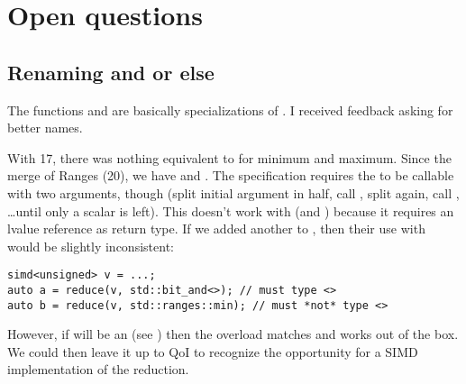 \section{Open questions}

\subsection{Renaming  and  or else}\label{sec:hminhmax}
The functions  and  are basically
specializations of .
I received feedback asking for better names.

With \CC{}17, there was nothing equivalent to \std{} for minimum
and maximum.
Since the merge of Ranges (\CC{}20), we have \stdranges{} and
\stdranges{}.
The  specification requires the  to be
callable with two  arguments, though (split initial argument in
half, call , split again, call , \ldots until
only a scalar is left).
This doesn't work with \stdranges{} (and ) because it
requires an lvalue reference as return type.
If we added another  to \stdranges{}, then their
use with  would be slightly inconsistent:
\medskip\begin{lstlisting}
simd<unsigned> v = ...;
auto a = reduce(v, std::bit_and<>); // must type <>
auto b = reduce(v, std::ranges::min); // must *not* type <>
\end{lstlisting}

However, if  will be an  (see )
then the
\stdranges{} overload matches and \stdranges{} works out of
the box.
We could then leave it up to QoI to recognize the opportunity for a SIMD
implementation of the reduction.

